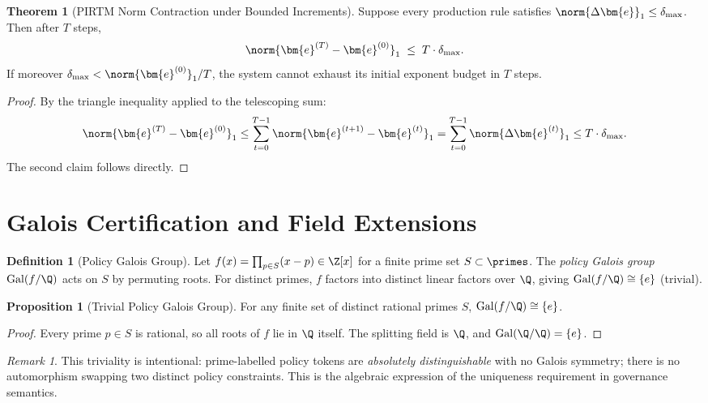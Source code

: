 \documentclass[12pt,letterpaper]{article}
\theoremstyle{definition}
\newtheorem{definition}{Definition}[section]
\newtheorem{theorem}{Theorem}[section]
\newtheorem{proposition}{Proposition}[section]
\theoremstyle{remark}
\newtheorem*{remark}{Remark}
\begin{document}
\begin{theorem}[PIRTM Norm Contraction under Bounded Increments]
  \label{thm:pirtm-contraction}
  Suppose every production rule satisfies
  \(\norm{\Delta\bm{e}}_1 \le \delta_{\max}\).  Then after \(T\) steps,
  \[
    \norm{\bm{e}^{(T)} - \bm{e}^{(0)}}_1 \;\le\; T \cdot \delta_{\max}.
  \]
  If moreover \(\delta_{\max} < \norm{\bm{e}^{(0)}}_1 / T\), the system
  cannot exhaust its initial exponent budget in \(T\) steps.
\end{theorem}

\begin{proof}
  By the triangle inequality applied to the telescoping sum:
  \[
    \norm{\bm{e}^{(T)} - \bm{e}^{(0)}}_1
    \le \sum_{t=0}^{T-1} \norm{\bm{e}^{(t+1)} - \bm{e}^{(t)}}_1
    = \sum_{t=0}^{T-1} \norm{\Delta\bm{e}^{(t)}}_1
    \le T \cdot \delta_{\max}.
  \]
  The second claim follows directly.
\end{proof}

\section{Galois Certification and Field Extensions}
\label{sec:galois}

\begin{definition}[Policy Galois Group]
  \label{def:galois}
  Let \(f(x) = \prod_{p \in S} (x - p) \in \Z[x]\) for a finite prime set
  \(S \subset \primes\).  The \emph{policy Galois group}
  \(\mathrm{Gal}(f/\Q)\) acts on \(S\) by permuting roots.
  For distinct primes, \(f\) factors into distinct linear factors over \(\Q\),
  giving \(\mathrm{Gal}(f/\Q) \cong \{e\}\) (trivial).
\end{definition}

\begin{proposition}[Trivial Policy Galois Group]
  \label{prop:galois-trivial}
  For any finite set of distinct rational primes \(S\),
  \(\mathrm{Gal}(f/\Q) \cong \{e\}\).
\end{proposition}

\begin{proof}
  Every prime \(p \in S\) is rational, so all roots of \(f\) lie in \(\Q\)
  itself.  The splitting field is \(\Q\), and
  \(\mathrm{Gal}(\Q/\Q) = \{e\}\).
\end{proof}

\begin{remark}
  This triviality is intentional: prime-labelled policy tokens are
  \emph{absolutely distinguishable} with no Galois symmetry; there is no
  automorphism swapping two distinct policy constraints.  This is the
  algebraic expression of the uniqueness requirement in governance semantics.
\end{remark}
\end{document}
